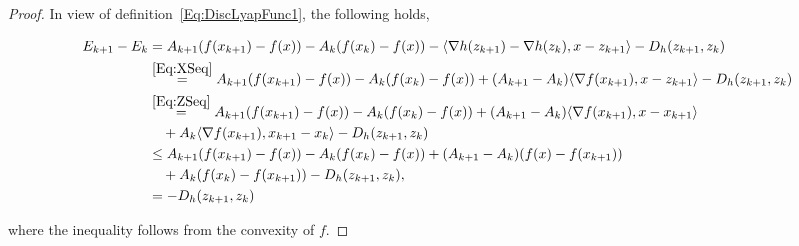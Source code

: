 \documentclass[11pt]{article}
\theoremstyle{plain}
\begin{document}
\begin{proof}
In view of definition~\eqref{Eq:DiscLyapFunc1}, the following holds,
\begin{small}
\begin{subequations}\label{Eq:LyapDiscArg}
\begin{align}
E_{k+1} - E_k &= A_{k+1}(f(x_{k+1}) - f(x)) - A_k(f(x_k) - f(x)) -\langle \nabla h(z_{k+1}) - \nabla h(z_k), x - z_{k+1}\rangle - D_h(z_{k+1}, z_k)\notag\\
& \overset{\eqref{Eq:XSeq}}{=} A_{k+1}(f(x_{k+1}) - f(x)) - A_k(f(x_k) - f(x)) + (A_{k+1} - A_k) \langle \nabla f(x_{k+1}), x - z_{k+1}\rangle - D_h(z_{k+1}, z_k)\notag\\
& \overset{\eqref{Eq:ZSeq}}{=} A_{k+1}(f(x_{k+1}) - f(x)) - A_k(f(x_k) - f(x)) + (A_{k+1} - A_k) \langle \nabla f(x_{k+1}), x - x_{k+1}\rangle \notag\\
&\quad + A_k \langle \nabla f(x_{k+1}), x_{k+1} - x_k\rangle- D_h(z_{k+1}, z_k)\notag\\
%
&\leq A_{k+1}(f(x_{k+1}) - f(x)) - A_k(f(x_k) - f(x)) + (A_{k+1} - A_k)(f(x) - f(x_{k+1})) \notag\\
&\quad  + A_k (f(x_k) - f(x_{k+1}))- D_h(z_{k+1}, z_k),\notag \\
&=- D_h(z_{k+1}, z_k) \notag
\end{align}
\end{subequations}
\end{small}
where the inequality follows from the convexity of $f$. 
\end{proof}
\end{document}
